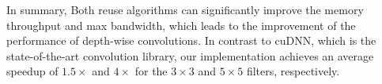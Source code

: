 
In summary, Both reuse algorithms can significantly improve the memory throughput and max bandwidth, which leads to the improvement of the performance of depth-wise convolutions.  In contrast to cuDNN, which is the state-of-the-art convolution library, our implementation achieves an average speedup of $1.5\times$ and $4\times$ for the $3 \times 3$ and $5 \times 5$ filters, respectively.

